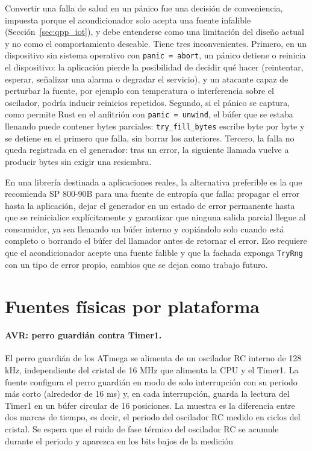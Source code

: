 Convertir una falla de salud en un pánico fue una decisión de conveniencia, impuesta porque el acondicionador solo acepta una fuente infalible (Sección~\ref{sec:qpp_iot}), y debe entenderse como una limitación del diseño actual y no como el comportamiento deseable. Tiene tres inconvenientes. Primero, en un dispositivo sin sistema operativo con \texttt{panic = \textquotedbl{}abort\textquotedbl{}}, un pánico detiene o reinicia el dispositivo: la aplicación pierde la posibilidad de decidir qué hacer (reintentar, esperar, señalizar una alarma o degradar el servicio), y un atacante capaz de perturbar la fuente, por ejemplo con temperatura o interferencia sobre el oscilador, podría inducir reinicios repetidos. Segundo, si el pánico se captura, como permite Rust en el anfitrión con \texttt{panic = \textquotedbl{}unwind\textquotedbl{}}, el búfer que se estaba llenando puede contener bytes parciales: \texttt{try\_fill\_bytes} escribe byte por byte y se detiene en el primero que falla, sin borrar los anteriores. Tercero, la falla no queda registrada en el generador: tras un error, la siguiente llamada vuelve a producir bytes sin exigir una resiembra.

En una librería destinada a aplicaciones reales, la alternativa preferible es la que recomienda SP 800-90B para una fuente de entropía que falla: propagar el error hasta la aplicación, dejar el generador en un estado de error permanente hasta que se reinicialice explícitamente y garantizar que ninguna salida parcial llegue al consumidor, ya sea llenando un búfer interno y copiándolo solo cuando está completo o borrando el búfer del llamador antes de retornar el error. Eso requiere que el acondicionador acepte una fuente falible y que la fachada exponga \texttt{TryRng} con un tipo de error propio, cambios que se dejan como trabajo futuro.

\section{Fuentes físicas por plataforma}
\label{sec:fuentes}

\paragraph{AVR: perro guardián contra Timer1.} El perro guardián de los ATmega se alimenta de un oscilador RC interno de 128 kHz, independiente del cristal de 16 MHz que alimenta la CPU y el Timer1. La fuente configura el perro guardián en modo de solo interrupción con su periodo más corto (alrededor de 16 ms) y, en cada interrupción, guarda la lectura del Timer1 en un búfer circular de 16 posiciones. La muestra es la diferencia entre dos marcas de tiempo, es decir, el periodo del oscilador RC medido en ciclos del cristal. Se espera que el ruido de fase térmico del oscilador RC se acumule durante el periodo y aparezca en los bits bajos de la medición

